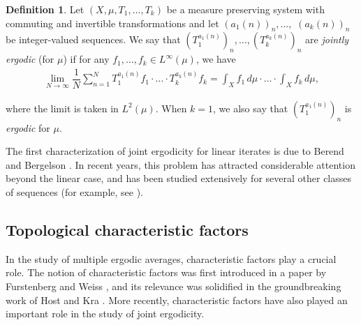 \documentclass[11pt,reqno]{amsart}
\theoremstyle{definition}
\newtheorem{definition}[definition]{Definition}
\theoremstyle{remark}
\begin{document}
\begin{definition}
    Let $(X,\mu,T_1,\dots,T_k)$ be a measure preserving system with commuting and invertible transformations and let $(a_1(n))_n, \dots,$ $ (a_k(n))_n$ be integer-valued sequences. We say that $(T_1^{a_1(n)})_n,\dots,(T_k^{a_k(n)})_n$ are \emph{jointly ergodic} (for $\mu$) if for any $f_1,\dots,f_k\in L^\infty(\mu)$, we have\begin{align*}
        \lim_{N\to\infty}\dfrac{1}{N} \sum_{n=1}^{N} T_1^{a_1(n)}f_1\cdot \ldots \cdot T_k^{a_k(n)}f_k = \int_X f_1\, d\mu \cdot \ldots \cdot \int_X f_k\, d\mu,
    \end{align*} 

    where the limit is taken in $L^2(\mu)$. When $k=1$, we also say that $(T_1^{a_1(n)})_n$ is \emph{ergodic} for $\mu$.
\end{definition}

The first characterization of joint ergodicity for linear iterates is due to Berend and Bergelson \cite{Berend_Bergelson_joint_ergodicity:1984}. In recent years, this problem has attracted considerable attention beyond the linear case, and has been studied extensively for several other classes of sequences (for example, see \cite{Donoso_Ferre_Koutsogiannis_Sun_multicorr_joint_erg:2024,Donoso_Koutsogiannis_Sun_joint_erg_poly_growth:2023,Donoso_Koutsogiannis_Sun_seminorms_polynomials_joint_ergodicity:2022,Donoso_Koutsogiannis_Kuca_Sun_Tsinas_resolving_joint_ergodicity_Hardy:2025,Donoso_Koutsogiannis_Kuca_Sun_Tsinas_seminorm_joint_ergodicity_independent_Hardy:2025,Frantzikinakis_Kuca_joint_erg_comm_poly:2025,Bergelson_Leibman_Son_joint_erg_generalized_linear:2016,Tsinas_joint_erg_Hardy:2023,Frantzikinakis_joint_ergodicity_sequences:2023,Koutsogiannis_Sun_total_joint_ergodicity:2023,Frantzikinakis_joint_erg_primes:2022,Frantzikinakis_Kuca_seminorm_control_pairwise_dependent_pol:2023}).

\subsection{Topological characteristic factors}

In the study of multiple ergodic averages, characteristic factors play a crucial role. The notion of characteristic factors was first introduced in a paper by Furstenberg and Weiss \cite{Furstenberg_Weiss_ergodic_thm_double:1996}, and its relevance was solidified in the groundbreaking work of Host and Kra \cite{Host_Kra_nonconventional_averages_nilmanifolds:2005}. More recently, characteristic factors have also played an important role in the study of joint ergodicity.
\end{document}
